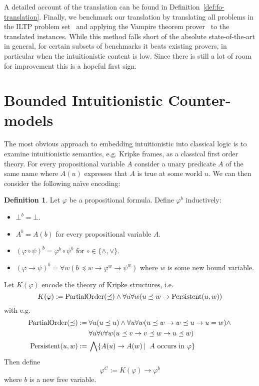 \documentclass{easychair}
\theoremstyle{definition}
\theoremstyle{definition}
\theoremstyle{definition}
\theoremstyle{definition}
\theoremstyle{definition}
\newtheorem{definition}[theorem]{Definition}
\theoremstyle{definition}
\theoremstyle{definition}
\begin{document}
A detailed account of the translation can be found in Definition~\ref{def:fo-translation}. Finally, we benchmark our translation by translating all problems in the ILTP problem set~\cite{iltp} and applying the Vampire theorem prover~\cite{kovacs2013first} to the translated instances. While this method falls short of the absolute state-of-the-art in general, for certain subsets of benchmarks it beats existing provers, in particular when the intuitionistic content is low. Since there is still a lot of room for improvement this is a hopeful first sign.

\section{Bounded Intuitionistic Counter-models}

The most obvious approach to embedding intuitionistic into classical logic is to examine intuitionistic semantics, e.g. Kripke frames, as a classical first order theory. For every propositional variable $A$ consider a unary predicate $A$ of the same name where $A(u)$ expresses that $A$ is true at some world $u$. We can then consider the following naïve encoding:
\pagebreak
\begin{definition}
	Let $\varphi$ be a propositional formula.
 Define $\varphi^{b}$ inductively:
	\begin{itemize}\addtolength{\itemsep}{-5pt}
		\item $\bot^b = \bot$.
		\item $A^{b} = A(b)$ for every propositional variable $A$.
		\item $(\varphi\circ\psi)^b = \varphi^b\circ\psi^b$ for $\circ\in\{\wedge, \vee\}$.
		\item $(\varphi\to \psi)^b = \forall w(b\preceq w\to\varphi^{w}\to\psi^{w})$ where $w$ is some new bound variable.
	\end{itemize}
	Let $K(\varphi)$ encode the theory of Kripke structures, i.e.
	\[K(\varphi) := \text{\normalfont PartialOrder}(\preceq)\wedge\forall u\forall w(u\preceq w\to \text{\normalfont Persistent}(u, w))\]
	with e.g.
	\begin{align*}
		\text{\normalfont PartialOrder}(\preceq) :=&\:\forall u(u\preceq u)\wedge\forall u\forall w(u\preceq w\to w\preceq u\to u = w)\wedge\\&\:\forall u\forall v\forall w(u\preceq v\to v\preceq w\to u\preceq w)\\
		\text{\normalfont Persistent}(u, w):=&\:\bigwedge \{A(u)\to A(w)\:|\: \text{ $A$ occurs in $\varphi$}\}
	\end{align*}
	Then define
	\[\varphi^{C} := K(\varphi)\to \varphi^{b}\]
	where $b$ is a new free variable.
\end{definition}
\end{document}
